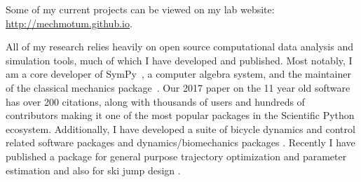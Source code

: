 \documentclass{article}
\begin{document}
Some of my
current projects can be viewed on my lab website:
\url{http://mechmotum.github.io}.

All of my research relies heavily on open source computational data analysis
and simulation tools, much of which I have developed and published. Most
notably, I am a core developer of SymPy~\cite{SymPyDevelopmentTeam2006}, a
computer algebra system, and the maintainer of the classical mechanics
package~\cite{Gede2013}. Our 2017 paper \cite{Meurer2017} on the 11 year old
software has over 200 citations, along with thousands of users and hundreds of
contributors making it one of the most popular packages in the Scientific
Python ecosystem.  Additionally, I have developed a suite of bicycle dynamics
and control related software packages
\cite{Moore2010b,Moore2011d,Moore2011a,Moore2011e} and dynamics/biomechanics
packages \cite{Dembia2011,Moore2011,Moore2011b} \cite{Moore2013b}
\cite{Moore2017b} \cite{Moore2018a}. Recently I have published a package for
general purpose trajectory optimization and parameter estimation
\cite{Moore2018} and also for ski jump design \cite{Moore2018a}.



\end{document}
